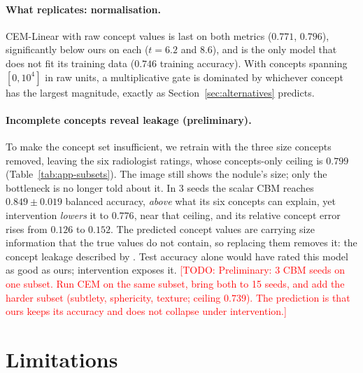 \documentclass[11pt]{article}
\newcommand{\todo}[1]{\textcolor{red}{[TODO: #1]}}
\begin{document}
\paragraph{What replicates: normalisation.}
CEM-Linear with raw concept values is last on both metrics ($0.771$, $0.796$),
significantly below ours on each ($t = 6.2$ and $8.6$), and is the only model
that does not fit its training data ($0.746$ training accuracy). With concepts
spanning $[0, 10^4]$ in raw units, a multiplicative gate is dominated by
whichever concept has the largest magnitude, exactly as
Section~\ref{sec:alternatives} predicts.

\paragraph{Incomplete concepts reveal leakage (preliminary).}
To make the concept set insufficient, we retrain with the three size concepts
removed, leaving the six radiologist ratings, whose concepts-only ceiling is
$0.799$ (Table~\ref{tab:app-subsets}). The image still shows the nodule's
size; only the bottleneck is no longer told about it. In 3 seeds the scalar
CBM reaches $0.849 \pm 0.019$ balanced accuracy, \emph{above} what its six
concepts can explain, yet intervention \emph{lowers} it to $0.776$, near that
ceiling, and its relative concept error rises from $0.126$ to $0.152$. The
predicted concept values are carrying size information that the true values do
not contain, so replacing them removes it: the concept leakage described by
\citet{mahinpei2021promises}. Test accuracy alone would have rated this model
as good as ours; intervention exposes it.
\todo{Preliminary: 3 CBM seeds on one subset. Run CEM on the same subset, bring
both to 15 seeds, and add the harder subset (subtlety, sphericity, texture;
ceiling $0.739$). The prediction is that ours keeps its accuracy and does not
collapse under intervention.}

\section{Limitations}
\label{sec:limitations}
\end{document}
